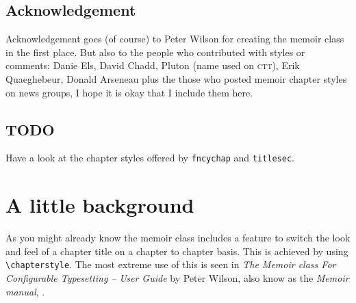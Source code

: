 \section*{Acknowledgement}

Acknowledgement goes (of course) to Peter Wilson for creating the
memoir class in the first place. But also to the people who
contributed with styles or comments: Danie Els, David Chadd, Pluton
(name used on \textsc{ctt}), Erik Quaeghebeur, Donald Arseneau plus
the those who posted memoir chapter styles on news groups, I hope it
is okay that I include them here.




\section*{TODO}
\label{sec:todo}

Have a look at the chapter styles offered by \texttt{fncychap} and
\texttt{titlesec}. 


\newpage

\chapter*{\contentsname}


\setlength\columnsep{8mm}
\begin{multicols}{2}
  \tableofcontents*
\end{multicols}

\newpage

\chapter{A little background}
\label{cha:little-background}

As you might already know the memoir class includes a feature to
switch the look and feel of a chapter title on a chapter to chapter
basis. This is achieved by using \verb+\chapterstyle+. The
most extreme use of this is seen in \emph{The Memoir class For
  Configurable Typesetting -- User Guide} by Peter Wilson, also know
as the \emph{Memoir manual}, \cite{memman}.


